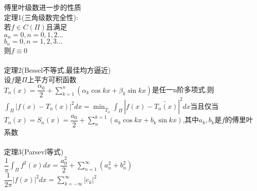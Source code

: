 \documentclass[11pt, a4paper, UTF8]{ctexart}
\begin{document}
傅里叶级数进一步的性质\\
定理1(三角级数完全性):\\
若$ f\in C(\Pi) $且满足\\
$ a_n=0,n=0,1,2... $\\
$ b_n=0,n=1,2,3... $\\
则$ f\equiv0 $\\
\\
定理2(Bessel不等式,最佳均方逼近)\\
设$ f $是$ \Pi $上平方可积函数\\
$ T_n(x)=\dfrac{\alpha_0}{2}+\sum\limits_{k=1}^{n}(\alpha_k\cos kx+\beta_k\sin kx) $是任一n阶多项式,则\\
$ \int_{\Pi}|f(x)-T_n(x)|^2dx=\min_{\tilde{T_n}}\int_{\Pi}|f(x)-\tilde{T_n(x)}|^2dx $当且仅当$ T_n(x)=S_n(x)=\dfrac{a_0}{2}+\sum\limits_{n}^{k=1}(a_k\cos kx+b_k\sin kx) $,其中$ a_k,b_k $是$ f $的傅里叶系数\\
\\
定理3(Parsevl等式)\\
$ \dfrac{1}{\pi}\int_{\Pi}f^2(x)dx=\dfrac{a_0^2}{2}+\sum\limits_{n=1}^{\infty}(a_n^2+b_n^2) $\\
$ \dfrac{1}{2\pi}|f(x)|^2dx=\sum\limits_{k=-\infty}^{\infty}|c_k|^2 $\\
\end{document}

